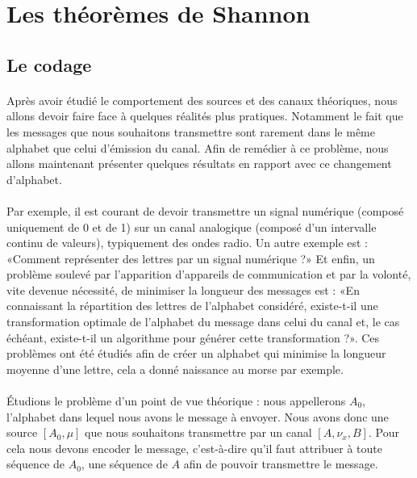 \section{Les théorèmes de Shannon}

\subsection{Le codage}
	\paragraph{}
	Après avoir étudié le comportement des sources et des canaux théoriques, nous
	allons devoir faire face à quelques réalités plus pratiques. Notamment le fait
	que les messages que nous souhaitons transmettre sont rarement dans le 
	même alphabet que celui d'émission du canal. Afin de remédier à ce problème,
	nous allons maintenant présenter quelques résultats en rapport avec ce 
	changement d'alphabet. 
	
	\paragraph{}
	Par exemple, il est courant de devoir transmettre un signal numérique
	(composé uniquement de 0 et de 1) sur un canal analogique (composé 
	d'un intervalle continu de valeurs), typiquement des ondes radio.
	Un autre exemple est : «Comment représenter des 
	lettres par un signal numérique ?» Et enfin, un problème soulevé par 
	l'apparition d'appareils de communication et par la volonté, vite devenue nécessité, 
	de minimiser la longueur des messages est :
	«En connaissant la répartition des lettres de l'alphabet considéré,
	existe-t-il une transformation optimale de l'alphabet du message
	dans celui du canal et, le cas échéant, existe-t-il un algorithme pour générer cette transformation ?».
	Ces problèmes ont été étudiés afin de créer un alphabet qui minimise la longueur moyenne
	d'une lettre, cela a donné naissance au morse par exemple. 
	
	\paragraph{}
	Étudions le problème d'un point de vue théorique :
	nous appellerons $A_0$, l'alphabet dans lequel nous avons le message à envoyer. Nous avons donc une source 
	$[A_0,\mu]$ que nous souhaitons transmettre par un canal $[A,\nu_x,B]$. Pour cela nous devons encoder
	le message, c'est-à-dire qu'il faut attribuer à toute séquence de $A_0$, une séquence de $A$ afin de 
	pouvoir transmettre le message.

